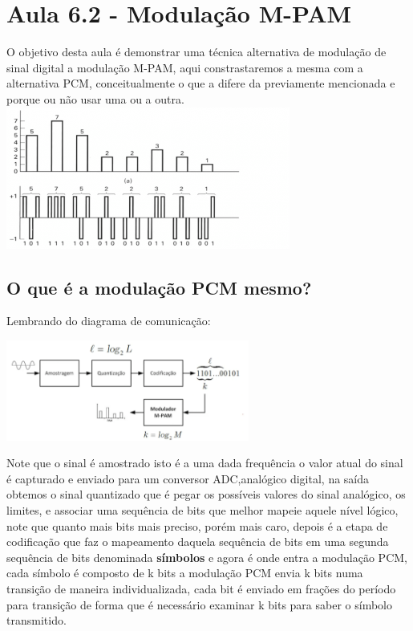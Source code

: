 
\section{Aula 6.2 - Modulação M-PAM}

O objetivo desta aula é demonstrar uma técnica alternativa de modulação de sinal digital a modulação M-PAM, aqui constrastaremos a mesma com a alternativa PCM, conceitualmente
o que a difere da previamente mencionada e porque ou não usar uma ou a outra.
\\

\includegraphics[width=0.7\textwidth]{../assets/mpam.png}

\subsection{O que é a modulação PCM mesmo?}

Lembrando do diagrama de comunicação:


\includegraphics[width=0.6\textwidth]{../assets/diagramacomm.png}


Note que o sinal é amostrado isto é a uma dada frequência o valor atual do sinal é capturado e enviado para um conversor ADC,analógico digital, na saída obtemos o sinal quantizado
que é pegar os possíveis valores do sinal analógico, os limites, e associar uma sequência de bits que melhor mapeie aquele nível lógico, note que quanto mais bits mais preciso,
porém mais caro, depois é a etapa de codificação que faz o mapeamento daquela sequência de bits em uma segunda sequência de bits denominada \textbf{símbolos} e agora é onde entra
a modulação PCM, cada símbolo é composto de k bits a modulação PCM envia k bits numa transição de maneira individualizada, cada bit é enviado em frações do período para transição
de forma que é necessário examinar k bits para saber o símbolo transmitido.


